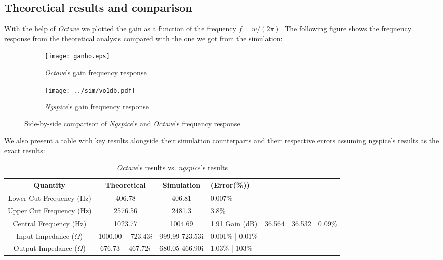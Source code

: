 \subsection{Theoretical results and comparison}

With the help of \textit{Octave} we plotted the gain as a function of the frequency $f=w/(2\pi)$. The following figure shows the frequency response from the theoretical analysis compared with the one we got from the simulation:
\begin{figure}[H]
\centering
\begin{subfigure}{.5\textwidth}
  \centering
  \texttt{[image: ganho.eps]}
  \caption{\textit{Octave}'s gain frequency response}
  \label{fig:Ngspicegain(f)}
\end{subfigure}%
\begin{subfigure}{.5\textwidth}
  \centering
  \texttt{[image: ../sim/vo1db.pdf]}
  \caption{\textit{Ngspice}'s gain frequency response}
  \label{fig:Ngspicegain(f)}
\end{subfigure}
\caption{Side-by-side comparison of \textit{Ngspice}'s and \textit{Octave}'s frequency response}
\label{fig:Gaincomparison}
\end{figure}

We also present a table with key results alongside their simulation counterparts and their respective errors assuming ngspice's results as the exact results:

\begin{center}
    \begin{table}[H]
        \centering
        \begin{tabular}{c|c|c}
          \textbf{Quantity} & \textbf{Theoretical}  & \textbf{Simulation} & \textbf(Error(\%))\\
          \hline

            Lower Cut Frequency (Hz) &  406.78 &  406.81 & 0.007\% \\
            Upper Cut Frequency (Hz)&  2576.56 &  2481.3 & 3.8\% \\
            Central Frequency (Hz)& 1023.77 &  1004.69 & 1.91%
            Gain (dB) &  36.564  & 36.532 & 0.09\% \\
            Input Impedance ($\Omega$) & $1000.00-723.43i$ & 999.99-723.53i & 0.001\% | 0.01\%\\
            Output Impedance ($\Omega$) & $676.73-467.72i$ & 680.05-466.90i & 1.03\% | 103\%\\
        \end{tabular}
        \caption{\textit{Octave}'s results vs. \textit{ngspice}'s results}
    \end{table}
\end{center}
